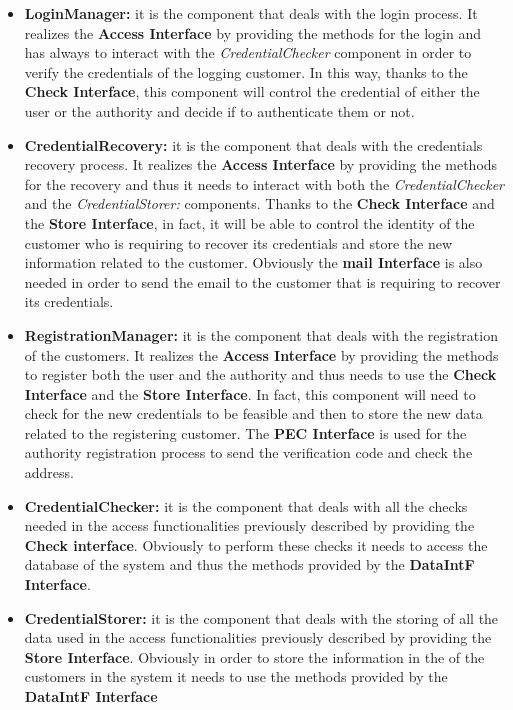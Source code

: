 			\begin{itemize}
				\item \textbf{LoginManager:} it is the component that deals with the login process. It realizes the \textbf{Access Interface} by providing the methods for the login and has always to interact with the \emph{CredentialChecker} component in order to verify the credentials of the logging customer. In this way, thanks to the \textbf{Check Interface}, this component will control the credential of either the user or the authority and decide if to authenticate them or not.
				
				\item \textbf{CredentialRecovery:} it is the component that deals with the credentials recovery process. It realizes the \textbf{Access Interface} by providing the methods for the recovery and thus it needs to interact with both the \emph{CredentialChecker} and the \emph{CredentialStorer:} components. Thanks to the \textbf{Check Interface} and the \textbf{Store Interface}, in fact, it will be able to control the identity of the customer who is requiring to recover its credentials and store the new information related to the customer. Obviously the \textbf{mail Interface} is also needed in order to send the email to the customer that is requiring to recover its credentials.
				
				\item \textbf{RegistrationManager:} it is the component that deals with the registration of the customers. It realizes the \textbf{Access Interface} by providing the methods to register both the user and the authority and thus needs to use the \textbf{Check Interface} and the \textbf{Store Interface}. In fact, this component will need to check for the new credentials to be feasible and then to store the new data related to the registering customer. The \textbf{PEC Interface} is used for the authority registration process to send the verification code and check the address.
				
				\item \textbf{CredentialChecker:} it is the component that deals with all the checks needed in the access functionalities previously described by providing the \textbf{Check interface}. Obviously to perform these checks it needs to access the database of the system and thus the methods provided by the \textbf{DataIntF Interface}.
				
				\item \textbf{CredentialStorer:} it is the component that deals with the storing of all the data used in the access functionalities previously described by providing the \textbf{Store Interface}.
				Obviously in order to store the information in the of the customers in the system it needs to use the methods provided by the \textbf{DataIntF Interface}
			\end{itemize}
		
